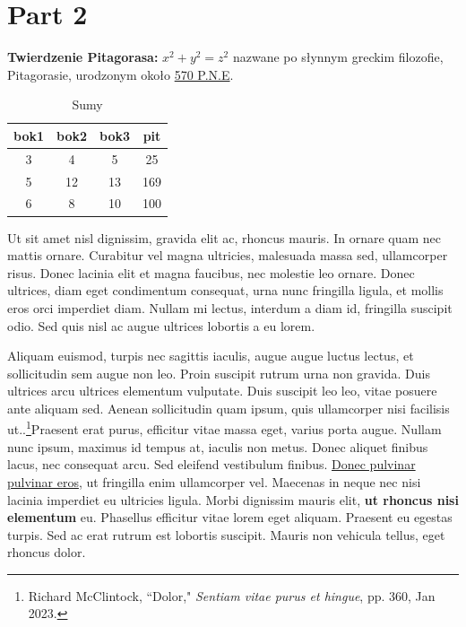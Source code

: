 \documentclass[12pt,a4paper]{article}
\begin{document}
\part{Part 2}
\textbf{Twierdzenie Pitagorasa:} \(x^2 + y^2 = z^2\) nazwane po słynnym greckim filozofie, Pitagorasie, urodzonym około \underline{570 P.N.E}.
\begin{table}[H]
		\centering
		\begin{tabular}{||c c c c||} 
			\hline
			bok1 & bok2 & bok3 & pit \\ [0.5ex] 
			\hline\hline
			3 & 4 & 5 & 25 \\ 
			\hline
			5 & 12 & 13 & 169 \\
			\hline
			6 & 8 & 10 & 100 \\ [1ex] 
			\hline
		\end{tabular}
\caption{Sumy}
\label{table: Sumy}
\end{table}
Ut sit amet nisl dignissim, gravida elit ac, rhoncus mauris. In ornare quam nec mattis ornare. Curabitur vel magna ultricies, malesuada massa sed, ullamcorper risus. Donec lacinia elit et magna faucibus, nec molestie leo ornare. Donec ultrices, diam eget condimentum consequat, urna nunc fringilla ligula, et mollis eros orci imperdiet diam. Nullam mi lectus, interdum a diam id, fringilla suscipit odio. Sed quis nisl ac augue ultrices lobortis a eu lorem.

Aliquam euismod, turpis nec sagittis iaculis, augue augue luctus lectus, et sollicitudin sem augue non leo. Proin suscipit rutrum urna non gravida. Duis ultrices arcu ultrices elementum vulputate. Duis suscipit leo leo, vitae posuere ante aliquam sed. Aenean sollicitudin quam ipsum, quis ullamcorper nisi facilisis ut..\footnote{Richard McClintock, ``Dolor," \emph{Sentiam vitae purus et hingue}, pp. 360, Jan 2023.}Praesent erat purus, efficitur vitae massa eget, varius porta augue. Nullam nunc ipsum, maximus id tempus at, iaculis non metus. Donec aliquet finibus lacus, nec consequat arcu. Sed eleifend vestibulum finibus.  \underline{Donec pulvinar pulvinar eros}, ut fringilla enim ullamcorper vel. Maecenas in neque nec nisi lacinia imperdiet eu ultricies ligula. Morbi dignissim mauris elit, \textbf{ut rhoncus nisi elementum} eu. Phasellus efficitur vitae lorem eget aliquam. Praesent eu egestas turpis. Sed ac erat rutrum est lobortis suscipit. Mauris non vehicula tellus, eget rhoncus dolor.
\end{document}

